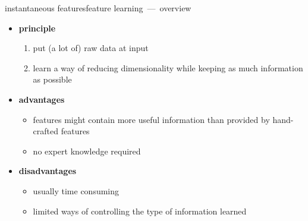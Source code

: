         \begin{frame}{instantaneous features}{feature learning~---~overview}
            \begin{itemize}
                \item   \textbf{principle}
                    \begin{enumerate}
                        \item   put (a lot of) raw data at input
                        \item   learn a way of reducing dimensionality while keeping as much information as possible
                    \end{enumerate}
                \bigskip
                \item<2->   \textbf{advantages}
                    \begin{itemize}
                        \item   features might contain more useful information than provided by hand-crafted features
                        \item   no expert knowledge required
                    \end{itemize}
                \smallskip
                \item<3->   \textbf{disadvantages}
                    \begin{itemize}
                        \item   usually time consuming
                        \item   limited ways of controlling the type of information learned
                    \end{itemize}
            \end{itemize}
		\end{frame}
